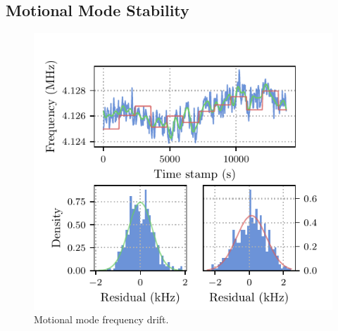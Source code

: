 \subsection{Motional Mode Stability}

    \begin{figure}
        \begin{center}
        \noindent\includegraphics[width=\linewidth]{
            figures/pdf_figure/mode_drift.pdf
            }
        \end{center}
        \caption{
            Motional mode frequency drift.
            }
        \label{fig:mode drift}
    \end{figure}

